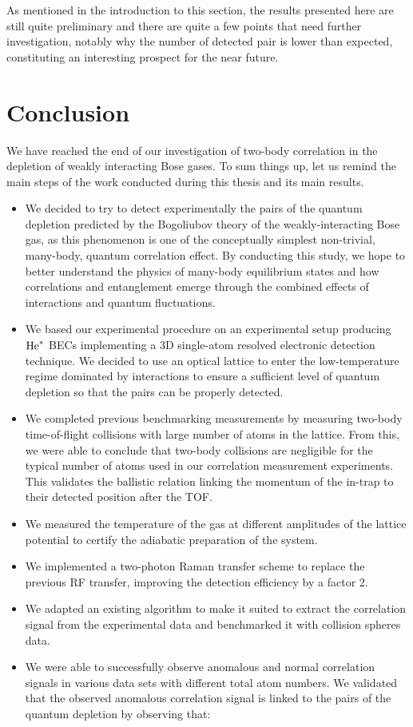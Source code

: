 As mentioned in the introduction to this section, the results presented here are still quite preliminary and there are quite a few points that need further investigation, notably why the number of detected pair is lower than expected, constituting an interesting prospect for the near future.

\section{Conclusion}

We have reached the end of our investigation of two-body correlation in the depletion of weakly interacting Bose gases. To sum things up, let us remind the main steps of the work conducted during this thesis and its main results.

\begin{itemize}
    \item We decided to try to detect experimentally the \kmk pairs of the quantum depletion predicted by the Bogoliubov theory of the weakly-interacting Bose gas, as this phenomenon is one of the conceptually simplest non-trivial, many-body, quantum correlation effect. By conducting this study, we hope to better understand the physics of many-body equilibrium states and how correlations and entanglement emerge through the combined effects of interactions and quantum fluctuations.
    \item We based our experimental procedure on an experimental setup producing $\mathrm{He}^*$ BECs  implementing a 3D single-atom resolved electronic detection technique. We decided to use an optical lattice to enter the low-temperature regime dominated by interactions to ensure a sufficient level of quantum depletion so that the \kmk pairs can be properly detected.
    \item We completed previous benchmarking measurements \cite{cayla2018single} by measuring two-body time-of-flight collisions with large number of atoms in the lattice. From this, we were able to conclude that two-body collisions are negligible for the typical number of atoms used in our correlation measurement experiments. This validates the ballistic relation linking the momentum of the in-trap to their detected position after the TOF.
    \item We measured the temperature of the gas at different amplitudes of the lattice potential to certify the adiabatic preparation of the system.
    \item We implemented a two-photon Raman transfer scheme to replace the previous RF transfer, improving the detection efficiency by a factor 2.
    \item We adapted an existing algorithm to make it suited to extract the \kmk correlation signal from the experimental data and benchmarked it with collision spheres data.
    \item We were able to successfully observe anomalous and normal correlation signals in various data sets with different total atom numbers. We validated that the observed anomalous correlation signal is linked to the \kmk pairs of the quantum depletion by observing that:
    \begin{itemize}
        

\end{itemize}
\end{itemize}
